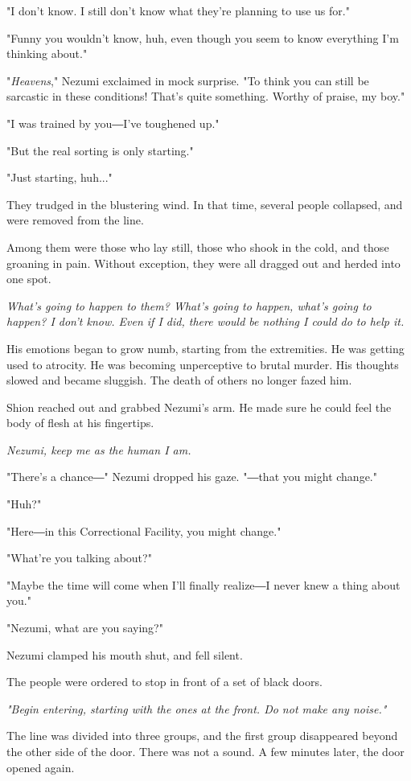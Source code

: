 "I don't know. I still don't know what they're planning to use us for."

"Funny you wouldn't know, huh, even though you seem to know everything
I'm thinking about."

"\emph{Heavens}," Nezumi exclaimed in mock surprise. "To think you can
still be sarcastic in these conditions! That's quite something. Worthy
of praise, my boy."

"I was trained by you―I've toughened up."

"But the real sorting is only starting."

"Just starting, huh..."

They trudged in the blustering wind. In that time, several people
collapsed, and were removed from the line.

Among them were those who lay still, those who shook in the cold, and
those groaning in pain. Without exception, they were all dragged out and
herded into one spot.

\emph{What's going to happen to them? What's going to happen, what's
going to happen? I don't know. Even if I did, there would be nothing I
could do to help it.}

His emotions began to grow numb, starting from the extremities. He was
getting used to atrocity. He was becoming unperceptive to brutal murder.
His thoughts slowed and became sluggish. The death of others no longer
fazed him.

Shion reached out and grabbed Nezumi's arm. He made sure he could feel
the body of flesh at his fingertips.

\emph{Nezumi, keep me as the human I am.}

"There's a chance―" Nezumi dropped his gaze. "―that you might change."

"Huh?"

"Here―in this Correctional Facility, you might change."

"What're you talking about?"

"Maybe the time will come when I'll finally realize―I never knew a thing
about you."

"Nezumi, what are you saying?"

Nezumi clamped his mouth shut, and fell silent.

The people were ordered to stop in front of a set of black doors.

\emph{"Begin entering, starting with the ones at the front. Do not make
any noise."}

The line was divided into three groups, and the first group disappeared
beyond the other side of the door. There was not a sound. A few minutes
later, the door opened again.

